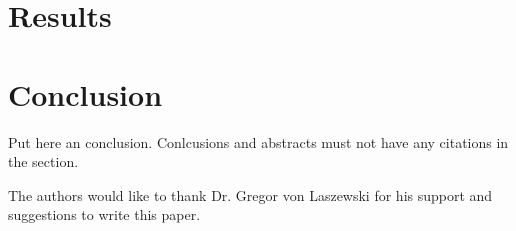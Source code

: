 \documentclass[sigconf]{acmart}
\begin{document}
\section{Results}



\section{Conclusion}

Put here an conclusion. Conlcusions and abstracts must not have any
citations in the section.


\begin{acks}

  The authors would like to thank Dr. Gregor von Laszewski for his
  support and suggestions to write this paper.

\end{acks}


 
\end{document}
